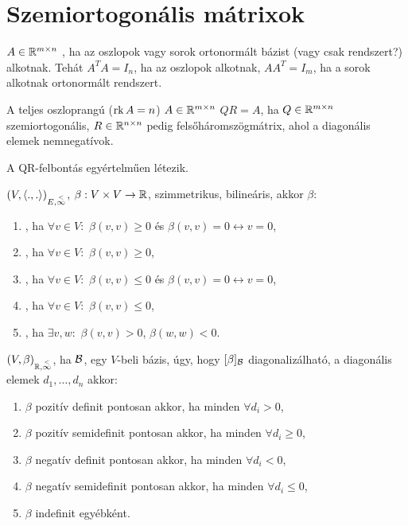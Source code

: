\section{Szemiortogonális mátrixok}
	\begin{ff}
		$A\in\mathbb{R}^{m\times n}$ , ha az oszlopok vagy sorok ortonormált
		bázist (vagy csak rendszert?) alkotnak. Tehát $A^TA=I_n$, ha az oszlopok
		alkotnak, $AA^T=I_m$, ha a sorok alkotnak ortonormált rendszert.
	\end{ff}
	\begin{ff}
		A teljes oszloprangú ($\operatorname{rk}{A}=n$) $A\in\mathbb{R}^{m\times n}$  $QR=A$, ha
		$Q\in\mathbb{R}^{m\times n}$ szemiortogonális, $R\in\mathbb{R}^{n\times n}$ pedig felsőháromszögmátrix, ahol a
		diagonális elemek nemnegatívok.
	\end{ff}
	\begin{tet}
		A QR-felbontás egyértelműen létezik.
	\end{tet}
	\begin{ff}
		$(V,\langle.,.\rangle)_{E,\overset{<}{\infty}}$, $\beta:V\times V\to \mathbb{R}$, szimmetrikus, bilineáris, akkor
	$\beta:$	
		\begin{enumerate}
			\item {}, ha $\forall v\in V:$ $\beta(v,v)\ge 0$ és
				$\beta(v,v)=0\leftrightarrow v=0$,
			\item {}, ha $\forall v\in V:$ $\beta(v,v)\ge 0$,
			\item {}, ha $\forall v\in V:$ $\beta(v,v)\leq 0$ és
				$\beta(v,v)=0\leftrightarrow v=0$,
			\item {}, ha $\forall v\in V:$ $\beta(v,v)\leq 0$,
			\item {}, ha $\exists v,w:$ $\beta(v,v)>0$, $\beta(w,w)<0$.
		\end{enumerate}
	\end{ff}
\begin{all}
		$(V,\beta)_{\mathbb{R},\overset{<}{\infty}}$, ha $\mathcal{B}$, egy $V$-beli bázis, úgy, hogy $[\beta]_{\mathcal{B}}$ 
		diagonalizálható, a diagonális elemek $d_1,\dots,d_n$ akkor:
		\begin{enumerate}
			\item $\beta$ pozitív definit pontosan akkor, ha minden $\forall
				d_i>0$,
			\item $\beta$ pozitív semidefinit pontosan akkor, ha minden
				$\forall d_i\geq 0$,
			\item $\beta$ negatív definit pontosan akkor, ha minden $\forall d_i<0$,
			\item $\beta$ negatív semidefinit pontosan akkor, ha minden
				$\forall d_i\leq 0$,
			\item $\beta$ indefinit egyébként.
		\end{enumerate}
	\end{all}

